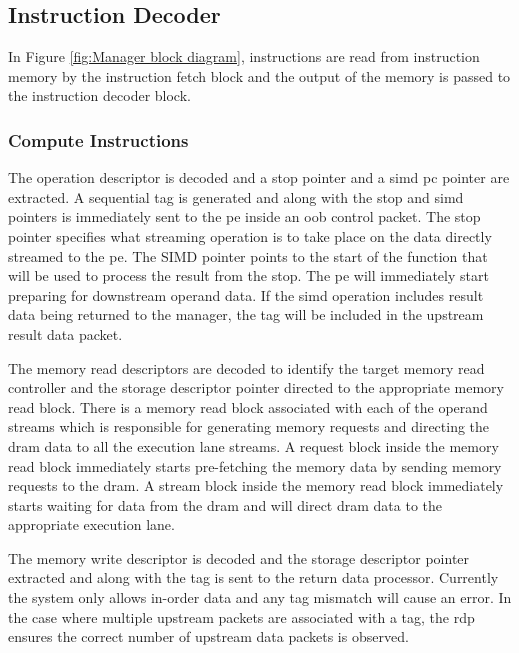 \subsection{Instruction Decoder}
\label{sec:Instruction Decoder}

In Figure \ref{fig:Manager block diagram}, instructions are read from instruction memory by the instruction fetch block and the output of the memory is passed to the instruction decoder block.

\subsubsection{Compute Instructions}
\label{sec:Decoding Compute Instructions}

The operation descriptor is decoded and a \ac{stop} pointer and a \ac{simd} \ac{pc} pointer are extracted. 
A sequential tag is generated and along with the \ac{stop} and \ac{simd} pointers is immediately sent to the \ac{pe} inside an \ac{oob} control packet.
The \ac{stop} pointer specifies what streaming operation is to take place on the data directly streamed to the \ac{pe}. 
The SIMD pointer points to the start of the function that will be used to process the result from the \ac{stop}.
The \ac{pe} will immediately start preparing for downstream operand data.
If the \ac{simd} operation includes result data being returned to the manager, the tag will be included in the upstream result data packet.

The memory read descriptors are decoded to identify the target memory read controller and the storage descriptor pointer directed to the appropriate memory read block.
There is a memory read block associated with each of the operand streams which is responsible for generating memory requests and directing the \ac{dram} data to all the execution lane streams.
A request block inside the memory read block immediately starts pre-fetching the memory data by sending memory requests to the \ac{dram}.
A stream block inside the memory read block immediately starts waiting for data from the \ac{dram} and will direct \ac{dram} data to the appropriate execution lane.

The memory write descriptor is decoded and the storage descriptor pointer extracted and along with the tag is sent to the return data processor.
Currently the system only allows in-order data and any tag mismatch will cause an error.
In the case where multiple upstream packets are associated with a tag, the \ac{rdp} ensures the correct number of upstream data packets is observed.

